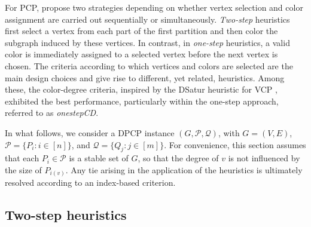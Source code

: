 \documentclass[preprint, 11pt, authoryear]{elsarticle}
\newcommand{\PP}{{\mathcal P}}
\newcommand{\QQ}{{\mathcal Q}}
\begin{document}
For PCP, \citet{li2000partition} propose two strategies depending on whether vertex selection and color assignment are carried out sequentially or simultaneously.
\emph{Two-step} heuristics first select a vertex from each part of the first partition and then color the subgraph induced by these vertices.
In contrast, in \emph{one-step} heuristics, a valid color is immediately assigned to a selected vertex before the next vertex is chosen.
The criteria according to which vertices and colors are selected are the main design choices and give rise to different, yet related, heuristics.
Among these, the color-degree criteria, inspired by the DSatur heuristic for VCP \citep{brelaz1979new}, exhibited the best performance, particularly within the one-step approach, referred to as \emph{onestepCD}.




In what follows, we consider a DPCP instance $(G, \PP, \QQ)$, with $G = (V,E)$, $\PP = \{P_i: i \in [n]\}$, and $\QQ = \{Q_j: j \in [m]\}$.
For convenience, this section assumes that each $P_i \in \PP$ is a stable set of $G$, so that the degree of $v$ is not influenced by the size of $P_{i(v)}$.
Any tie arising in the application of the heuristics is ultimately resolved according to an index-based criterion.

\subsection{Two-step heuristics}\label{sec:heuristics:2:step}
\end{document}

